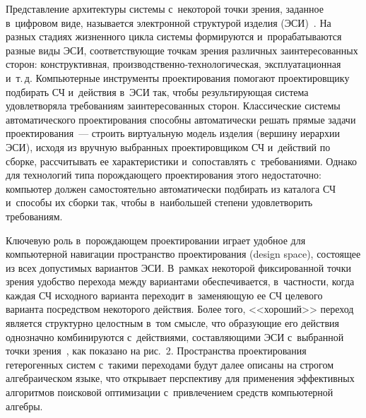 \begin{multicols}{2}
Представление архитектуры системы с~некоторой точки зрения, заданное 
в~цифровом виде, называется электронной структурой изделия  
(ЭСИ)~\cite{10-kov}. На разных стадиях жизненного цикла системы 
формируются и~прорабатываются разные виды ЭСИ, соответствующие точкам 
зрения различных заинтересованных сторон: конструктивная,  
про\-из\-вод\-ст\-вен\-но-тех\-но\-ло\-ги\-че\-ская, эксплуатационная и~т.\,д. 
Компьютерные инструменты проектирования помогают проектировщику 
подбирать СЧ и~действия в~ЭСИ так, чтобы результирующая система 
удовле\-тво\-ря\-ла требованиям заинтересованных сторон. Классические 
сис\-те\-мы автоматического проектирования 
способны автоматически решать прямые задачи проектирования~--- строить 
виртуальную модель изделия (вершину иерархии ЭСИ), исходя из вручную 
выбранных проектировщиком СЧ и~действий по сборке, рассчитывать ее 
характеристики и~сопоставлять с~требованиями. Однако для технологий типа 
порождающего проектирования этого недостаточно: компьютер должен 
самостоятельно автоматически подбирать из каталога СЧ и~способы их сборки 
так, чтобы в~наибольшей степени удовлетворить требованиям.










Ключевую роль в~порождающем проектировании играет удобное для 
компьютерной навигации пространство проектирования (design space), 
состоящее из всех допустимых вариантов ЭСИ. В~рамках некоторой 
фиксированной точки зрения удобство перехода между вариантами 
обеспечивается, в~частности, когда каждая СЧ исходного варианта переходит 
в~заменяющую ее СЧ целевого варианта посредством некоторого действия. 
Более того, <<хороший>> переход является структурно целостным в~том 
смыс\-ле, что образующие его действия однозначно комбинируются 
с~действиями, со\-став\-ля\-ющи\-ми ЭСИ с~выбранной точки зрения~\cite{11-kov}, 
как показано на рис.~2. Пространства проектирования гетерогенных сис\-тем 
с~такими переходами будут далее описаны на строгом алгебраическом языке, 
что открывает перспективу для применения эффективных алгоритмов 
поисковой оптимизации с~привлечением средств компьютерной ал\-гебры.




\end{multicols}
